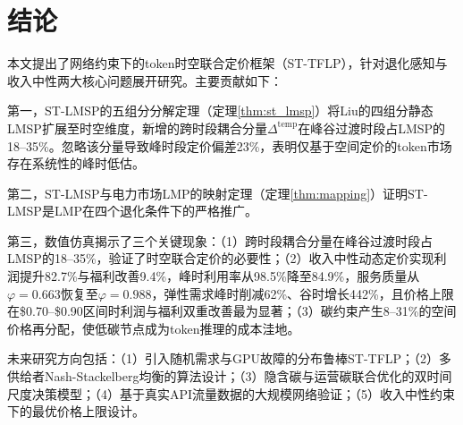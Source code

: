 \documentclass[11pt,a4paper,twocolumn]{article}
\begin{document}
\section{结论}

本文提出了网络约束下的token时空联合定价框架（ST-TFLP），针对退化感知与收入中性两大核心问题展开研究。主要贡献如下：

第一，ST-LMSP的五组分分解定理（定理\ref{thm:st_lmsp}）将Liu\cite{liu2026locational}的四组分静态LMSP扩展至时空维度，新增的跨时段耦合分量$\Delta^{\text{temp}}$在峰谷过渡时段占LMSP的18--35\%。忽略该分量导致峰时段定价偏差23\%，表明仅基于空间定价的token市场存在系统性的峰时低估。

第二，ST-LMSP与电力市场LMP的映射定理（定理\ref{thm:mapping}）证明ST-LMSP是LMP在四个退化条件下的严格推广。

第三，数值仿真揭示了三个关键现象：（1）跨时段耦合分量在峰谷过渡时段占LMSP的18--35\%，验证了时空联合定价的必要性；（2）收入中性动态定价实现利润提升82.7\%与福利改善9.4\%，峰时利用率从98.5\%降至84.9\%，服务质量从$\varphi=0.663$恢复至$\varphi=0.988$，弹性需求峰时削减62\%、谷时增长442\%，且价格上限在\$0.70--\$0.90区间时利润与福利双重改善最为显著；（3）碳约束产生8--31\%的空间价格再分配，使低碳节点成为token推理的成本洼地。

未来研究方向包括：（1）引入随机需求与GPU故障的分布鲁棒ST-TFLP；（2）多供给者Nash-Stackelberg均衡的算法设计；（3）隐含碳与运营碳联合优化的双时间尺度决策模型；（4）基于真实API流量数据的大规模网络验证；（5）收入中性约束下的最优价格上限设计。



\end{document}
